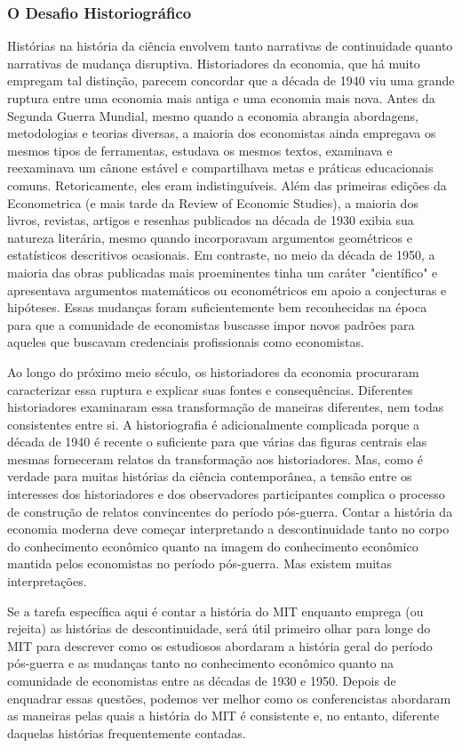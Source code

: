 \documentclass[12pt]{article}
\begin{document}
\subsubsection{\textbf{O Desafio Historiográfico}}
Histórias na história da ciência envolvem tanto narrativas de continuidade quanto narrativas de mudança disruptiva. Historiadores da economia, que há muito empregam tal distinção, parecem concordar que a década de 1940 viu uma grande ruptura entre uma economia mais antiga e uma economia mais nova. Antes da Segunda Guerra Mundial, mesmo quando a economia abrangia abordagens, metodologias e teorias diversas, a maioria dos economistas ainda empregava os mesmos tipos de ferramentas, estudava os mesmos textos, examinava e reexaminava um cânone estável e compartilhava metas e práticas educacionais comuns. Retoricamente, eles eram indistinguíveis. Além das primeiras edições da Econometrica (e mais tarde da Review of Economic Studies), a maioria dos livros, revistas, artigos e resenhas publicados na década de 1930 exibia sua natureza literária, mesmo quando incorporavam argumentos geométricos e estatísticos descritivos ocasionais. Em contraste, no meio da década de 1950, a maioria das obras publicadas mais proeminentes tinha um caráter "científico" e apresentava argumentos matemáticos ou econométricos em apoio a conjecturas e hipóteses. Essas mudanças foram suficientemente bem reconhecidas na época para que a comunidade de economistas buscasse impor novos padrões para aqueles que buscavam credenciais profissionais como economistas.

Ao longo do próximo meio século, os historiadores da economia procuraram caracterizar essa ruptura e explicar suas fontes e consequências. Diferentes historiadores examinaram essa transformação de maneiras diferentes, nem todas consistentes entre si. A historiografia é adicionalmente complicada porque a década de 1940 é recente o suficiente para que várias das figuras centrais elas mesmas forneceram relatos da transformação aos historiadores. Mas, como é verdade para muitas histórias da ciência contemporânea, a tensão entre os interesses dos historiadores e dos observadores participantes complica o processo de construção de relatos convincentes do período pós-guerra. Contar a história da economia moderna deve começar interpretando a descontinuidade tanto no corpo do conhecimento econômico quanto na imagem do conhecimento econômico mantida pelos economistas no período pós-guerra. Mas existem muitas interpretações.

Se a tarefa específica aqui é contar a história do MIT enquanto emprega (ou rejeita) as histórias de descontinuidade, será útil primeiro olhar para longe do MIT para descrever como os estudiosos abordaram a história geral do período pós-guerra e as mudanças tanto no conhecimento econômico quanto na comunidade de economistas entre as décadas de 1930 e 1950. Depois de enquadrar essas questões, podemos ver melhor como os conferencistas abordaram as maneiras pelas quais a história do MIT é consistente e, no entanto, diferente daquelas histórias frequentemente contadas.
\end{document}
